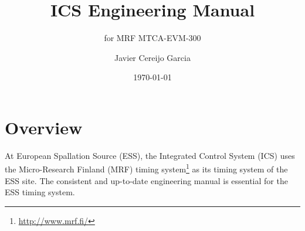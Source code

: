 \documentclass[11pt
  , a4paper
  , article
  , oneside
  , showtrims
]{memoir}
\begin{document}
%

%

%
\date{\today}

%

%

%

%
\title{ICS Engineering Manual}
\subtitle{for MRF MTCA-EVM-300}
\author{Javier Cereijo Garcia}





\showtrimson

\esstitle
\newpage
\tableofcontents
\newpage



\chapter{Overview}
At European Spallation Source (ESS), the Integrated Control System (ICS) uses the Micro-Research Finland (MRF) timing system{\footnote{\url{http://www.mrf.fi/}}} as its timing system of the ESS site. The consistent and up-to-date engineering manual is essential for the ESS timing system.\\
\end{document}
